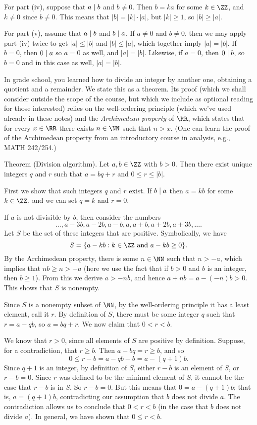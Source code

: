 For part (iv), suppose that $a\mid b$ and $b\ne 0$. Then $b = ka$ for some $k\in \ZZ$,
and $k\ne 0$ since $b\ne 0$. This means that $|b| = |k|\cdot |a|$, but $|k|\ge 1$,
so $|b|\ge |a|$.

For part (v), assume that $a\mid b$ and $b\mid a$. If $a\ne 0$ and $b\ne 0$, then we may apply
part (iv) twice to get $|a|\le |b|$ and $|b|\le |a|$, which together imply $|a| = |b|$. If $b=0$,
then $0\mid a$ so $a = 0$ as well, and $|a| = |b|$. Likewise, if $a = 0$, then $0\mid b$,
so $b=0$ and in this case as well, $|a| = |b|$.\slug

In grade school, you learned how to divide an integer by another one, obtaining a quotient and a remainder.
We state this as a theorem. Its proof (which we shall consider outside the scope of the course,
but which we include as optional reading for those interested)
relies on the well-ordering principle (which we've used
already in these notes)
and the {\it Archimedean property} of $\RR$, which states that for every $x\in \RR$ there
exists $n\in \NN$ such that $n > x$. (One can learn the proof of the Archimedean property from an introductory
course in analysis, e.g., {\mc MATH} 242/254.)

\parenproclaim Theorem {\advthm} (Division algorithm). Let $a,b\in \ZZ$ with $b> 0$. Then there
exist unique integers $q$ and $r$ such that $a = bq+r$ and $0\le r\le |b|$.

\noindent{}\enspace First we show that such integers $q$ and $r$
exist. If $b\mid a$ then $a = kb$ for some $k\in \ZZ$,
and we can set $q = k$ and $r = 0$.

If $a$ is not divisible by $b$, then consider the numbers
$$ \ldots, a - 3b, a-2b, a-b, a, a+b, a+2b, a+3b, \ldots.$$
Let $S$ be the set of these integers that are positive. Symbolically, we have
$$ S = \{a-kb : k\in \ZZ\ \hbox{and}\ a-kb\ge 0\}.$$
By the Archimedean property, there is some $n\in \NN$ such that $n> -a$, which
implies that $nb \ge n > -a$ (here we use the fact that if $b>0$ and $b$ is an integer, then
$b\ge 1$). From this we derive $a > -nb$, and hence $a+nb = a - (-n)b > 0$. This shows
that $S$ is nonempty.

Since $S$ is a nonempty subset of $\NN$, by the well-ordering principle it has a least
element, call it $r$. By definition of $S$, there must be some integer $q$ such that
$r = a-qb$, so $a = bq + r$. We now claim that $0<r<b$.

We know that $r> 0$, since all elements of $S$ are positive by definition. Suppose,
for a contradiction, that $r\ge b$. Then $a - bq = r \ge b$, and so
$$0 \le r-b = a - qb - b = a-(q+1)b.$$
Since $q+1$ is an integer, by definition of $S$, either $r-b$ is an element of $S$,
or $r-b = 0$. Since $r$ was defined to be the minimal element of $S$, it cannot be the
case that $r-b$ is in $S$. So $r-b = 0$. But this means that $0 = a-(q+1)b$; that is,
$a = (q+1)b$, contradicting our assumption that $b$ does not divide $a$. The contradiction
allows us to conclude that $0<r<b$ (in the case that $b$ does not divide $a$). In general,
we have shown that $0\le r<b$.


